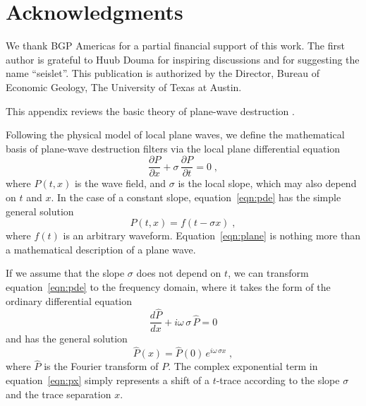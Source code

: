 \section{Acknowledgments}

We thank BGP Americas for a partial financial support of this work. The first
author is grateful to Huub Douma for inspiring discussions and for suggesting 
the name ``seislet''. This publication is authorized by the Director, Bureau 
of Economic Geology, The University of Texas at Austin.



{This appendix reviews the basic theory of plane-wave destruction 
\cite[]{GEO67-06-19461960}.}

{Following the physical model of local plane waves, we 
define the mathematical basis of plane-wave destruction filters via
the local plane differential equation \cite[]{pvi}
\begin{equation}
  \label{eqn:pde}
  \frac{\partial P}{\partial x} +
  \sigma\,\frac{\partial P}{\partial t} = 0\;,
\end{equation}
where $P(t,x)$ is the wave field, and $\sigma$ is the local slope, which may
also depend on $t$ and $x$. In the case of a constant slope,
equation~\ref{eqn:pde} has the simple general solution
\begin{equation}
  \label{eqn:plane}
  P(t,x) = f(t - \sigma x)\;,
\end{equation}
where $f(t)$ is an arbitrary waveform. Equation~\ref{eqn:plane} is
nothing more than a mathematical description of a plane wave.}

{If we assume that the slope $\sigma$ does not depend on $t$, we can
transform equation~\ref{eqn:pde} to the frequency domain, where it
takes the form of the ordinary differential equation
\begin{equation}
  \label{eqn:ode}
  \frac{d \hat{P}}{d x} +
  i \omega\,\sigma\, \hat{P} = 0
\end{equation}
and has the general solution
\begin{equation}
  \label{eqn:px}
  \hat{P} (x) = \hat{P} (0)\,e^{i \omega\,\sigma x}\;,
\end{equation}
where $\hat{P}$ is the Fourier transform of $P$. The complex
exponential term in equation~\ref{eqn:px} simply represents a shift
of a $t$-trace according to the slope $\sigma$ and the trace separation
$x$.}

